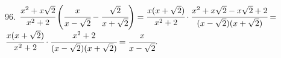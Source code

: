 96. $\cfrac{x^2+x\sqrt{2}}{x^2+2}\left(\cfrac{x}{x-\sqrt{2}}-\cfrac{\sqrt{2}}{x+\sqrt{2}}\right)=
\cfrac{x(x+\sqrt{2})}{x^2+2}\cdot\cfrac{x^2+x\sqrt{2}-x\sqrt{2}+2}{(x-\sqrt{2})(x+\sqrt{2})}=$\\$
\cfrac{x(x+\sqrt{2})}{x^2+2}\cdot\cfrac{x^2+2}{(x-\sqrt{2})(x+\sqrt{2})}=\cfrac{x}{x-\sqrt{2}}.$\\
